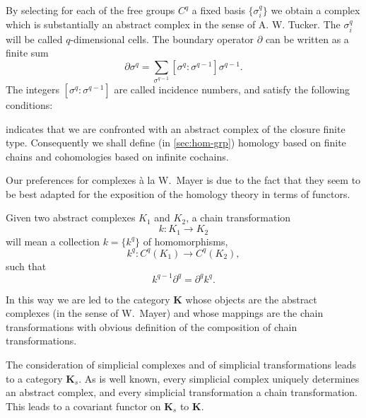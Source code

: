 \documentclass[11pt,a4paper]{report}
\begin{document}
By selecting for each of the free groups $C^q$ a fixed basis $\{\sigma_i^q\}$ we obtain a complex which is substantially
an abstract complex in the sense of A. W. Tucker. The $\sigma_i^q$ will be called $q$-dimensional cells. The boundary
operator $\partial$ can be written as a finite sum
\begin{equation*}
	\partial\sigma^q=\sum_{\sigma^{q-1}}[\sigma^q : \sigma^{q-1}]\sigma^{q-1}.
\end{equation*}
The integers $[\sigma^q : \sigma^{q-1}]$ are called incidence numbers, and satisfy the following conditions:
 indicates that we are confronted with an abstract complex of the closure finite type. Consequently we shall define
(in \cref{sec:hom-grp}) homology based on finite chains and cohomologies based on infinite cochains.

Our preferences for complexes \`{a} la W.~Mayer is due to the fact that they seem to be best adapted for the exposition of the homology
theory in terms of functors.

Given two abstract complexes $K_1$ and $K_2$, a chain transformation
\begin{equation*}
	k:K_1\rightarrow K_2
\end{equation*}
will mean a collection $k=\{k^q\}$ of homomorphisms,
\begin{equation*}
	k^q:C^q(K_1)\rightarrow C^q(K_2),
\end{equation*}
such that
\begin{equation*}
	k^{q-1}\partial^{q} = \partial^q k^q.
\end{equation*}

In this way we are led to the category $\mathbf{K}$ whose objects are the abstract complexes (in the sense of W.~Mayer) and whose
mappings are the chain transformations with obvious definition of the composition of chain transformations.

The consideration of simplicial complexes and of simplicial transformations leads to a category $\mathbf{K}_s$. As is well known,
every simplicial complex uniquely determines an abstract complex, and every simplicial transformation a chain transformation.
This leads to a covariant functor on $\mathbf{K}_s$ to $\mathbf{K}$.
\end{document}
